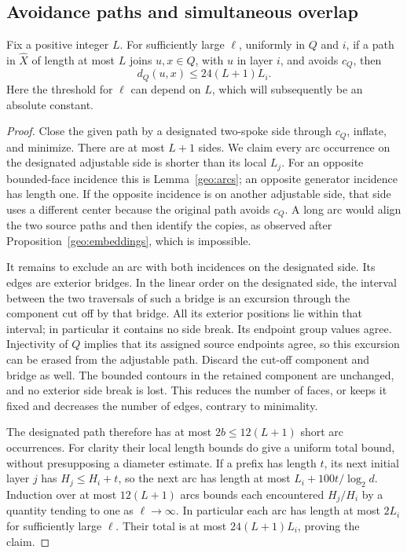 \subsection{Avoidance paths and simultaneous overlap}
\label{geo:overlap}

\begin{lemma}
\label{geo:avoidance}
Fix a positive integer $L$.  For sufficiently large $\ell$, uniformly in
$Q$ and $i$, if a path in $\widehat X$ of length at most $L$ joins
$u,x\in Q$, with $u$ in layer $i$, and avoids $c_Q$, then
\begin{equation}
 d_Q(u,x)\le24(L+1)L_i.
 \label{geo:avoidance-bound}
\end{equation}
Here the threshold for $\ell$ can depend on $L$, which will subsequently
be an absolute constant.
\end{lemma}

\begin{proof}
Close the given path by a designated two-spoke side through $c_Q$, inflate,
and minimize.  There are at most $L+1$ sides.  We claim every arc occurrence
on the designated adjustable side is shorter than its local $L_j$.
For an opposite bounded-face incidence this is Lemma~\ref{geo:arcs};
an opposite generator incidence has length one.  If the opposite incidence
is on another adjustable side, that side uses a different center because
the original path avoids $c_Q$.  A long arc would align the two source
paths and then identify the copies, as observed after
Proposition~\ref{geo:embeddings}, which is impossible.

It remains to exclude an arc with both incidences on the designated side.
Its edges are exterior bridges.  In the linear order on the designated
side, the interval between the two traversals of such a bridge is an
excursion through the component cut off by that bridge.  All its exterior
positions lie within that interval; in particular it contains no side
break.  Its endpoint group values agree.  Injectivity of $Q$ implies that
its assigned source endpoints agree, so this excursion can be erased from
the adjustable path.  Discard the cut-off component and bridge as well.
The bounded contours in the retained component are unchanged, and no
exterior side break is lost.  This reduces the number of faces, or keeps
it fixed and decreases the number of edges, contrary to minimality.

The designated path therefore has at most $2b\le12(L+1)$ short arc
occurrences.  For clarity their local length bounds do give a uniform
total bound, without presupposing a diameter estimate.  If a prefix has
length $t$, its next initial layer $j$ has $H_j\le H_i+t$, so the next
arc has length at most $L_i+100t/\log_2d$.  Induction over at most
$12(L+1)$ arcs bounds each encountered $H_j/H_i$ by a quantity tending
to one as $\ell\to\infty$.  In particular each arc has length at most
$2L_i$ for sufficiently large $\ell$.  Their total is at most
$24(L+1)L_i$, proving the claim.
\end{proof}


